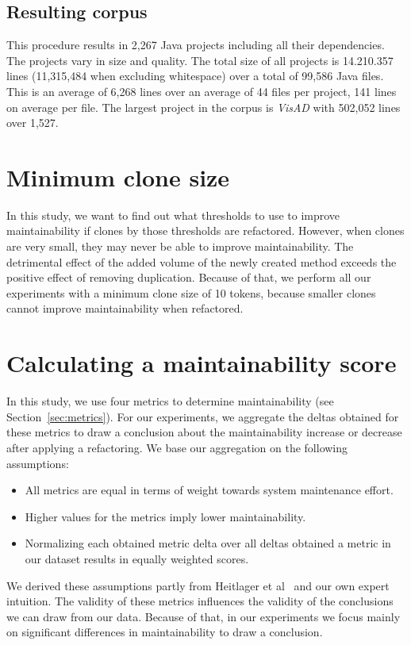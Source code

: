 \subsection{Resulting corpus}
This procedure results in 2,267 Java projects including all their dependencies. The projects vary in size and quality. The total size of all projects is 14.210.357 lines (11,315,484 when excluding whitespace) over a total of 99,586 Java files. This is an average of 6,268 lines over an average of 44 files per project, 141 lines on average per file. The largest project in the corpus is \textit{VisAD} with 502,052 lines over 1,527.

\section{Minimum clone size}
In this study, we want to find out what thresholds to use to improve maintainability if clones by those thresholds are refactored. However, when clones are very small, they may never be able to improve maintainability. The detrimental effect of the added volume of the newly created method exceeds the positive effect of removing duplication. Because of that, we perform all our experiments with a minimum clone size of 10 tokens, because smaller clones cannot improve maintainability when refactored.

\section{Calculating a maintainability score}\label{sec:metricformula}
In this study, we use four metrics to determine maintainability (see Section~\ref{sec:metrics}). For our experiments, we aggregate the deltas obtained for these metrics to draw a conclusion about the maintainability increase or decrease after applying a refactoring. We base our aggregation on the following assumptions:
\begin{itemize}
  \item All metrics are equal in terms of weight towards system maintenance effort.
  \item Higher values for the metrics imply lower maintainability.
  \item Normalizing each obtained metric delta over all deltas obtained a metric in our dataset results in equally weighted scores.
\end{itemize}
We derived these assumptions partly from Heitlager et al~\cite{heitlager2007practical} and our own expert intuition. The validity of these metrics influences the validity of the conclusions we can draw from our data. Because of that, in our experiments we focus mainly on significant differences in maintainability to draw a conclusion.

